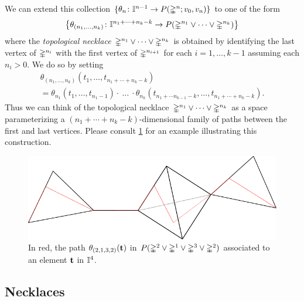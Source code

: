 We can extend this collection $\{\theta_n \colon \gcube^{n-1} \to P(\gsimplex^n;v_0,v_n)\}$ to one of the form
\[
\set[\big]{\theta_{(n_1, \dots, n_k)} \colon \gcube^{n_1 + \dots + n_k-k} \to P(\gsimplex^{n_1} \vee \cdots \vee \gsimplex^{n_k})}
\]
where the \textit{topological necklace} $\gsimplex^{n_1} \vee \cdots \vee \gsimplex^{n_k}$ is obtained by identifying the last vertex of $\gsimplex^{n_i}$ with the first vertex of $\gsimplex^{n_{i+1}}$ for each $i = 1, \dots, k-1$ assuming each $n_i > 0$.
We do so by setting
\begin{multline*}
	\theta_{(n_1, \ldots, n_k)}(t_1, \ldots, t_{n_1+ \cdots + n_k-k}) \\ =
	\theta_{n_1}(t_1, \ldots, t_{n_1-1}) \cdot\ \dots\ \cdot \theta_{n_k}(t_{n_1+ \cdots n_{k-1}-k},\ldots,t_{n_1 + \cdots +n_k-k}).
\end{multline*}
Thus we can think of the topological necklace $\gsimplex^{n_1} \vee \cdots \vee \gsimplex^{n_k}$ as a space parameterizing a $(n_1+ \cdots + n_k-k)$-dimensional family of paths between the first and last vertices.
Please consult \cref{f:theta2} for an example illustrating this construction.

\begin{figure}
	\centering
	\includegraphics[scale=1]{aux/theta2.pdf}
	\caption{In red, the path $\theta_{(2,1,3,2)}(\bft)$ in $P(\gsimplex^2 \vee \gsimplex^1 \vee \gsimplex^3 \vee \gsimplex^2)$ associated to an element $\bft$ in $\gcube^{4}$.}
	\label{f:theta2}
\end{figure}

\subsection{Necklaces}

